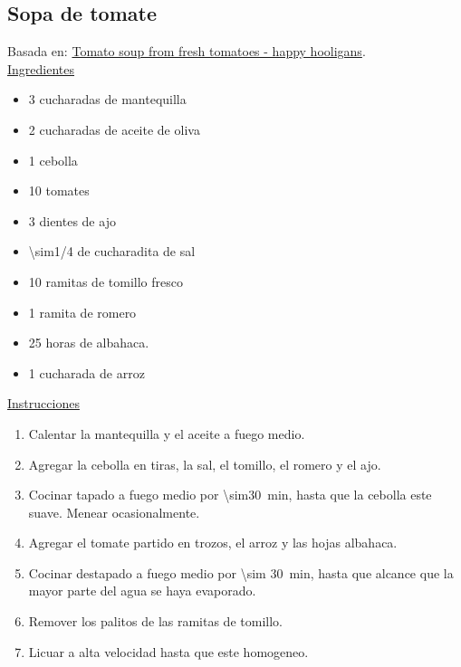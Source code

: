 \subsection{Sopa de tomate}

Basada en: \href{https://happyhooligans.ca/best-homemade-tomato-soup-recipe/}{Tomato soup from fresh tomatoes - happy hooligans}. \\

\underline{Ingredientes}

\begin{itemize}
\item 3 cucharadas de mantequilla
\item 2 cucharadas de aceite de oliva 
\item 1 cebolla
\item 10 tomates
\item 3 dientes de ajo
\item \num{\sim1/4} de cucharadita de sal 
\item 10 ramitas de tomillo fresco
\item 1 ramita de romero
\item 25 horas de albahaca. 
\item 1 cucharada de arroz
\end{itemize}

\underline{Instrucciones}

\begin{enumerate}
\item Calentar la mantequilla y el aceite a fuego medio.
\item Agregar la cebolla en tiras, la sal, el tomillo, el romero y el ajo.
\item Cocinar tapado a fuego medio por \SI{\sim30}{min}, hasta que la cebolla este suave. Menear ocasionalmente. 
\item Agregar el tomate partido en trozos, el arroz y las hojas albahaca.
\item Cocinar destapado a fuego medio por \SI{\sim 30}{min}, hasta que alcance que la mayor parte del agua se haya evaporado.
\item Remover los palitos de las ramitas de tomillo.
\item Licuar a alta velocidad hasta que este homogeneo.
\end{enumerate}
